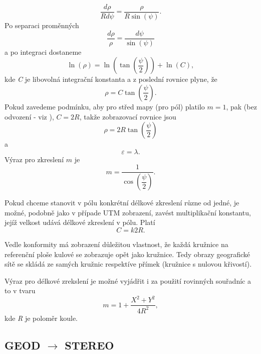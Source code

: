 \documentclass[11pt,a4paper]{article}
\begin{document}
\begin{equation}
\dfrac{d\rho}{Rd\psi} = \dfrac{\rho}{R\sin{\left(\psi\right)}}.
\end{equation} 
Po separaci proměnných 
\begin{equation}
\dfrac{d\rho}{\rho} = \dfrac{d\psi}{\sin{\left(\psi\right)}}
\end{equation}
a po integraci dostaneme
\begin{equation}
\ln{\left(\rho\right)} = \ln{\left(\tan{\left(\dfrac{\psi}{2}\right)}\right)} + \ln{\left(C\right)},
\end{equation}
kde \textit{C} je libovolná integrační konstanta a z poslední rovnice plyne, že
\begin{equation}
\rho = C\tan{\left(\dfrac{\psi}{2}\right)}.
\end{equation}
Pokud zavedeme podmínku, aby pro střed mapy (pro pól) platilo $m = 1$, pak (bez odvození - viz \cite{Buchar2002}), $C = 2R$, takže zobrazovací rovnice jsou
\begin{equation}
\rho = 2R\tan{\left(\dfrac{\psi}{2}\right)}
\end{equation}
a
\begin{equation}
\varepsilon = \lambda.
\end{equation}
Výraz pro zkreslení $m$ je
\begin{equation}
m = \dfrac{1}{\cos{\left(\dfrac{\psi}{2}\right)}}.
\end{equation}

Pokud chceme stanovit v pólu konkrétní délkové zkreslení různe od jedné, je možné, podobně jako v případe UTM zobrazení, zavést multiplikační konstantu, jejíž velkost udává délkové zkreslení v pólu. Platí
\begin{equation}
C = k2R.
\end{equation}

Vedle konformity má zobrazení důležitou vlastnost, že každá kružnice na referenční ploše kulové se zobrazuje opět jako kružnice. Tedy obrazy geografické sítě se skládá ze samých kružnic respektíve přímek (kružnice s nulovou křivostí).

Výraz pro délkové zrekslení je možné vyjádřit i za použití rovinných souřadníc a to v tvaru
\begin{equation}
m = 1+\dfrac{X^{2}+Y^{2}}{4R^{2}}, 
\end{equation}
kde \textit{R} je poloměr koule.

\newpage
\subsection{GEOD $\rightarrow$ STEREO}
\end{document}
